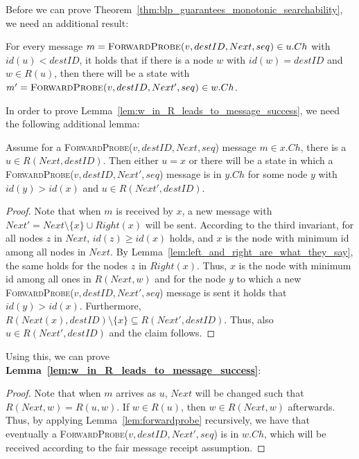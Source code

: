 \documentclass[a4paper,USenglish]{lipics}
\newcommand{\forwardprobe}[1]{\textsc{ForwardProbe(\ensuremath{#1})}\xspace}
\begin{document}
Before we can prove Theorem~\ref{thm:blp_guarantees_monotonic_searchability}, we need an additional result:
\begin{lemma}\label{lem:w_in_R_leads_to_message_success}
 For every message $m = \forwardprobe{v,destID, Next, seq} \in u.Ch$ with $id(u) < destID$, it holds that if there is a node $w$ with $id(w)=destID$ and $w \in R(u)$, then there will be a state with $m' = \forwardprobe{v,destID, Next', seq} \in w.Ch$.
\end{lemma}
In order to prove Lemma~\ref{lem:w_in_R_leads_to_message_success}, we need the following additional lemma:
\begin{lemma}\label{lem:forwardprobe}
Assume for a \forwardprobe{v,destID, Next, seq} message $m \in x.Ch$, there is a $u \in R(Next,destID)$.
Then either $u = x$ or there will be a state in which a \forwardprobe{v,destID, Next', seq} message is  in $y.Ch$ for some node $y$ with $id(y) > id(x)$ and $u \in R(Next',destID)$.
\end{lemma}
\begin{proof}
	Note that when $m$ is received by $x$, a new message with $Next' = Next\setminus\{x\} \cup Right(x)$ will be sent.
	According to the third invariant, for all nodes $z$ in $Next$, $id(z) \geq id(x)$ holds, and $x$ is the node with minimum id among all nodes in $Next$.
	By Lemma~\ref{lem:left_and_right_are_what_they_say}, the same holds for the nodes $z$ in $Right(x)$.
	Thus, $x$ is the node with minimum id among all ones in $R(Next,w)$ and for the node $y$ to which a new \forwardprobe{v,destID,Next',seq} message is sent it holds that $id(y) > id(x)$.
	Furthermore, $R(Next(x),destID)\setminus \{x\} \subseteq R(Next',destID)$.
	Thus, also $u \in R(Next',destID)$ and the claim follows.
\end{proof}
Using this, we can prove \textbf{Lemma~\ref{lem:w_in_R_leads_to_message_success}}:
\begin{proof}
	Note that when $m$ arrives as $u$, $Next$ will be changed such that $R(Next,w) = R(u,w)$.
	If $w \in R(u)$, then $w \in R(Next,w)$ afterwards.
	Thus, by applying Lemma~\ref{lem:forwardprobe} recursively, we have that eventually  a \forwardprobe{v,destID, Next', seq} is in $w.Ch$, which will be received according to the fair message receipt assumption.	
\end{proof}
\end{document}
